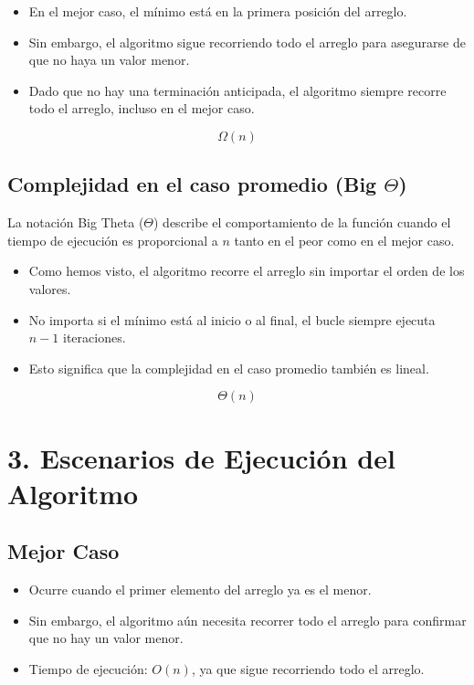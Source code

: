 \documentclass{article}
\begin{document}
	\begin{itemize}
		\item En el mejor caso, el mínimo está en la primera posición del arreglo.
		\item Sin embargo, el algoritmo sigue recorriendo todo el arreglo para asegurarse de que no haya un valor menor.
		\item Dado que no hay una terminación anticipada, el algoritmo siempre recorre todo el arreglo, incluso en el mejor caso.
	\end{itemize}
	
	\[
	\Omega(n)
	\]
	
	\subsection*{Complejidad en el caso promedio (Big $\Theta$)}
	La notación Big Theta ($\Theta$) describe el comportamiento de la función cuando el tiempo de ejecución es proporcional a $ n $ tanto en el peor como en el mejor caso.
	
	\begin{itemize}
		\item Como hemos visto, el algoritmo recorre el arreglo sin importar el orden de los valores.
		\item No importa si el mínimo está al inicio o al final, el bucle siempre ejecuta $ n-1 $ iteraciones.
		\item Esto significa que la complejidad en el caso promedio también es lineal.
	\end{itemize}
	
	\[
	\Theta(n)
	\]
	
	\section{3. Escenarios de Ejecución del Algoritmo}
	
	\subsection*{Mejor Caso}
	\begin{itemize}
		\item Ocurre cuando el primer elemento del arreglo ya es el menor.
		\item Sin embargo, el algoritmo aún necesita recorrer todo el arreglo para confirmar que no hay un valor menor.
		\item Tiempo de ejecución: $ O(n) $, ya que sigue recorriendo todo el arreglo.
	\end{itemize}
	
\end{document}
